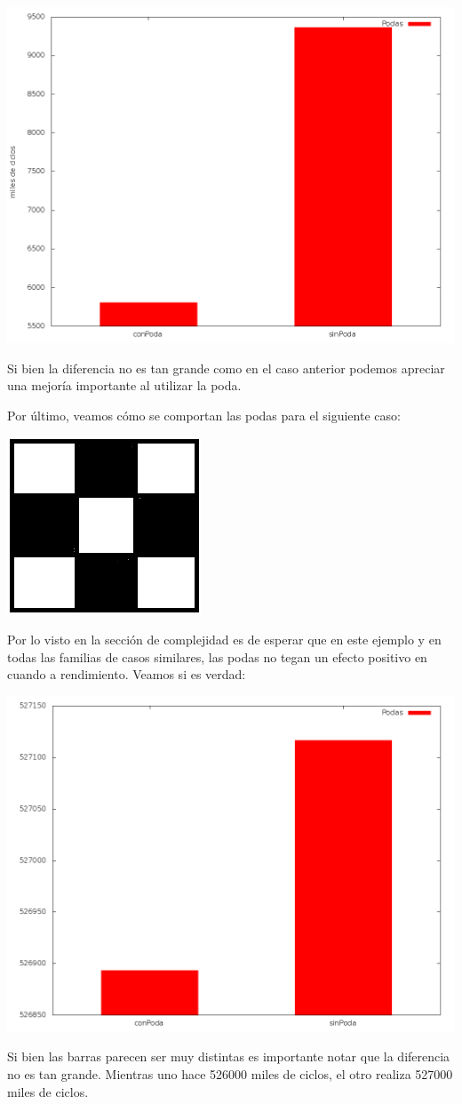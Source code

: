 \includegraphics[scale=0.3]{ej3/imgs/22casos.png}

Si bien la diferencia no es tan grande como en el caso anterior podemos apreciar una mejoría importante al utilizar la poda.

Por último, veamos cómo se comportan las podas para el siguiente caso:

\includegraphics[scale=0.5]{ej3/imgs/ajedrezDibujo.png}

Por lo visto en la sección de complejidad es de esperar que en este ejemplo y en todas las familias de casos similares, las podas no tegan un efecto positivo en cuando a rendimiento. Veamos si es verdad:

\includegraphics[scale=0.3]{ej3/imgs/ajedrez.png}

Si bien las barras parecen ser muy distintas es importante notar que la diferencia no es tan grande. Mientras uno hace 526000 miles de ciclos, el otro realiza 527000 miles de ciclos.
